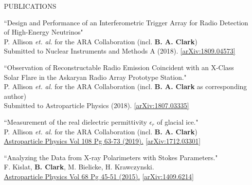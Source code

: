 \documentclass{resume} %
\begin{document}
\begin{rSection}{PUBLICATIONS}
\begin{etaremune}%
  \item ``Design and Performance of an Interferometric Trigger Array for Radio Detection of High-Energy Neutrinos" \\
 P. Allison {\it et. al.} for the ARA Collaboration (incl. \textbf{B. A. Clark}) \\
 Submitted to Nuclear Instruments and Methods A (2018). \href{https://arxiv.org/abs/1809.04573}{[arXiv:1809.04573]}
 \item ``Observation of Reconstructable Radio Emission Coincident with an X-Class Solar Flare in the Askaryan Radio Array Prototype Station." \\
 P. Allison {\it et. al.} for the ARA Collaboration (incl. \textbf{B. A. Clark} as corresponding author) \\
 Submitted to Astroparticle Physics (2018). \href{https://arxiv.org/abs/1807.03335}{[arXiv:1807.03335]}
  \item ``Measurement of the real dielectric permittivity $\epsilon_r$ of glacial ice." \\
 P. Allison {\it et. al.} for the ARA Collaboration (incl. \textbf{B. A. Clark}) \\
  \href{https://doi.org/10.1016/j.astropartphys.2019.01.004}{Astroparticle Physics Vol 108 Pg 63-73 (2019).} \href{https://arxiv.org/abs/1712.03301}{[arXiv:1712.03301]} 
   \item ``Analyzing the Data from X-ray Polarimeters with Stokes Parameters." \\
 F. Kislat,  \textbf{B. Clark}, M. Bielicke, H. Krawczynski.  \\
  \href{http://dx.doi.org/10.1016/j.astropartphys.2015.02.007}{Astroparticle Physics Vol 68 Pg 45-51 (2015).} \href{https://arxiv.org/abs/1409.6214}{[arXiv:1409.6214]} 
 \end{etaremune}
\end{rSection}

\end{document}
